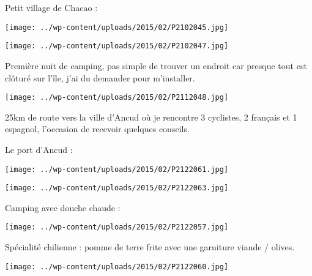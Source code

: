 \pagebreak
 Petit village de Chacao :
\begin{center} \texttt{[image: ../wp-content/uploads/2015/02/P2102045.jpg]} \end{center}
\begin{center} \texttt{[image: ../wp-content/uploads/2015/02/P2102047.jpg]} \end{center}

\pagebreak
 Première nuit de camping, pas simple de trouver un endroit car presque tout est clôturé sur l'île, j'ai du demander pour m'installer. 
\begin{center} \texttt{[image: ../wp-content/uploads/2015/02/P2112048.jpg]} \end{center}

 25km de route vers la ville d'Ancud où je rencontre 3 cyclistes, 2 français et 1 espagnol, l'occasion de recevoir quelques conseils.

 Le port d'Ancud :
\begin{center} \texttt{[image: ../wp-content/uploads/2015/02/P2122061.jpg]} \end{center}
\begin{center} \texttt{[image: ../wp-content/uploads/2015/02/P2122063.jpg]} \end{center}

 Camping avec douche chaude :
\begin{center} \texttt{[image: ../wp-content/uploads/2015/02/P2122057.jpg]} \end{center}

\pagebreak
Spécialité chilienne : pomme de terre frite avec une garniture viande / olives.
\begin{center} \texttt{[image: ../wp-content/uploads/2015/02/P2122060.jpg]} \end{center}
